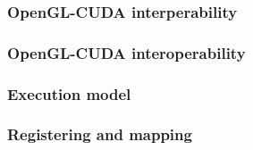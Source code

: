 \begin{frame}[fragile]

\frametitle{OpenGL-CUDA interperability}

\end{frame}

\begin{frame}[fragile]

\frametitle{OpenGL-CUDA interoperability}

\end{frame}


\begin{frame}[fragile]

\frametitle{Execution model}


\end{frame}

\begin{frame}[fragile]

\frametitle{Registering and mapping}


\end{frame}



